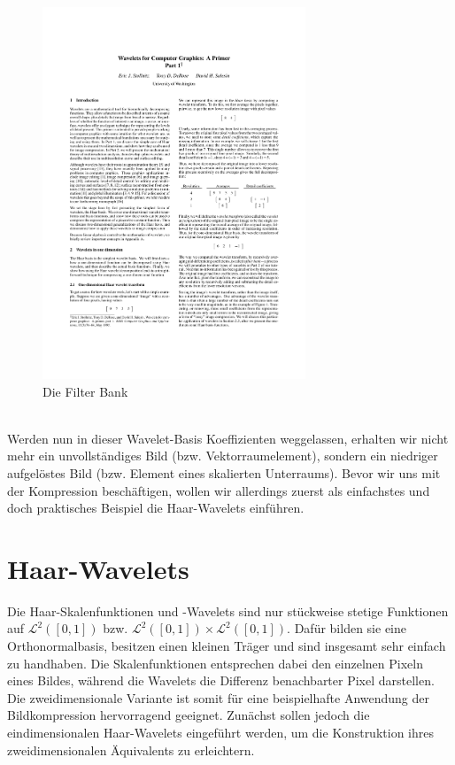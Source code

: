 \begin{figure}[h]
	\centering
	\includegraphics[page=11, trim=60 695 305 100, clip, width=0.7\textwidth]{4_wavelet_final[14255].pdf}
	\caption{Die Filter Bank}
\end{figure}\\
Werden nun in dieser Wavelet-Basis Koeffizienten weggelassen, erhalten wir nicht mehr ein unvollständiges Bild (bzw. Vektorraumelement), sondern ein niedriger aufgelöstes Bild (bzw. Element eines skalierten Unterraums). Bevor wir uns mit der Kompression beschäftigen, wollen wir allerdings zuerst als einfachstes und doch praktisches Beispiel die Haar-Wavelets einführen.


\section{Haar-Wavelets}

Die Haar-Skalenfunktionen und -Wavelets sind nur stückweise stetige Funktionen auf $\mathcal{L}^2([0,1])$ bzw. $\mathcal{L}^2([0,1])\times\mathcal{L}^2([0,1])$. Dafür bilden sie eine Orthonormalbasis, besitzen einen kleinen Träger und sind insgesamt sehr einfach zu handhaben. Die Skalenfunktionen entsprechen dabei den einzelnen Pixeln eines Bildes, während die Wavelets die Differenz benachbarter Pixel darstellen. Die zweidimensionale Variante ist somit für eine beispielhafte Anwendung der Bildkompression hervorragend geeignet. Zunächst sollen jedoch die eindimensionalen Haar-Wavelets eingeführt werden, um die Konstruktion ihres zweidimensionalen Äquivalents zu erleichtern.

